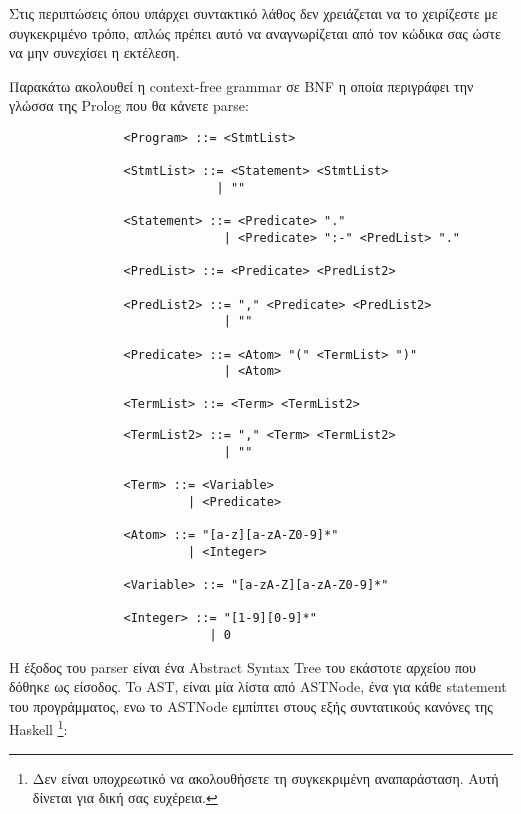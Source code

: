 \documentclass[10pt]{article}
\begin{document}
Στις περιπτώσεις όπου υπάρχει συντακτικό λάθος δεν χρειάζεται να το χειρίζεστε με συγκεκριμένο τρόπο, απλώς πρέπει αυτό να αναγνωρίζεται από τον κώδικα σας ώστε να μην συνεχίσει η εκτέλεση.\ 

Παρακάτω ακολουθεί η context-free grammar σε BNF η οποία περιγράφει την γλώσσα της Prolog που θα κάνετε parse:


\begin{verbatim}
                <Program> ::= <StmtList>

                <StmtList> ::= <Statement> <StmtList>
                             | ""
                                  
                <Statement> ::= <Predicate> "."
                              | <Predicate> ":-" <PredList> "."
                           
                <PredList> ::= <Predicate> <PredList2>

                <PredList2> ::= "," <Predicate> <PredList2>
                              | ""
                     
                <Predicate> ::= <Atom> "(" <TermList> ")"
                              | <Atom>
                        
                <TermList> ::= <Term> <TermList2>
\end{verbatim}
\begin{verbatim}
                <TermList2> ::= "," <Term> <TermList2>
                              | ""
                        
                <Term> ::= <Variable>
                         | <Predicate>
                    
                <Atom> ::= "[a-z][a-zA-Z0-9]*"
                         | <Integer>

                <Variable> ::= "[a-zA-Z][a-zA-Z0-9]*"

                <Integer> ::= "[1-9][0-9]*"
                            | 0
\end{verbatim}





H έξοδος του parser είναι ένα Abstract Syntax Tree του εκάστοτε αρχείου που δόθηκε ως είσοδος. To AST, είναι μία λίστα από ASTNode, ένα για κάθε statement του προγράμματος, ενω το ASTNode εμπίπτει στους εξής συντατικούς κανόνες της Haskell \footnote{Δεν είναι υποχρεωτικό να ακολουθήσετε τη συγκεκριμένη αναπαράσταση. Αυτή δίνεται για δική σας ευχέρεια.}:
\end{document}
